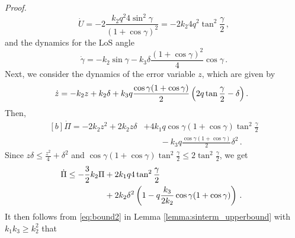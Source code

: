 \documentclass[journal,twoside,web]{ieeecolor}
\theoremstyle{definition}
\renewenvironment{proof}[1][Proof]{\par\pushQED{\qed}\normalfont\textit{#1.}~}{\popQED\par}
\begin{document}
\begin{proof}
\begin{equation}
\dot U  = -2 \frac{k_2  q^2 4 \sin^2\gamma}{(1+\cos\gamma)^2} = - 2 k_2 4 q^2  \tan^2 \frac{\gamma}{2}\,,
\end{equation}
and the dynamics for the LoS angle 
\begin{equation}
\dot\gamma = - k_2 \sin\gamma -  k_3 \delta\frac{(1+\cos\gamma)^2}{4} \cos\gamma  \,.
\end{equation}
Next, we consider the dynamics of the error variable $z$, which are given by
\begin{equation}
\hspace*{-0.2cm}
\dot z = -k_2z + k_2\delta + k_3 q \frac{\cos\gamma(1+\cos\gamma)}{2}\left( 2 q \tan\frac{\gamma}{2}-\delta\right).    
\end{equation}
Then,
\begin{equation}
\begin{aligned}[b]
\dot \Pi = - 2k_2z^2 + 2k_2 z \delta &+ 
4 k_1 q \cos\gamma(1+\cos\gamma) \tan^2\frac{\gamma}{2} \\
&\qquad  -k_3 q \frac{\cos\gamma(1+\cos\gamma)} {2}\delta^2\,.
\end{aligned}
\end{equation}
Since $z\delta \leq  \frac{z^2}{4} + \delta^2$ and $\cos\gamma(1+\cos\gamma) \tan^2\frac{\gamma}{2} \leq  2 \tan^2 \frac{\gamma}{2}
$, we get
\begin{equation}
\hspace*{-0.2cm}
\begin{aligned}[b]
    \dot \Pi \le - \frac{3}{2}k_2 \Pi &+ 2 k_ 1 q 4 \tan^2 \frac{\gamma}{2} \\
&+ 2 k_2 \delta^2\left(1- q \frac{k_3 }{2 k_2} 
\cos\gamma(1+\cos\gamma)\right)\,.
\end{aligned}
\end{equation}
It then follows from \eqref{eq:bound2} in Lemma \ref{lemma:sinterm_upperbound} with $k_1 k_3 \ge  k_2^2$ that 
\begin{equation}

\end{equation}
\end{proof}
\end{document}
